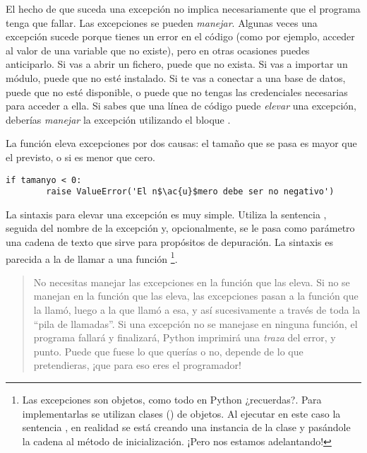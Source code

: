 El hecho de que suceda una excepción no implica necesariamente que el programa tenga que fallar. Las excepciones se pueden \emph{manejar}. Algunas veces una excepción sucede porque tienes un error en el código (como por ejemplo, acceder al valor de una variable que no existe), pero en otras ocasiones puedes anticiparlo. Si vas a abrir un fichero, puede que no exista. Si vas a importar un módulo, puede que no esté instalado. Si te vas a conectar a una base de datos, puede que no esté disponible, o puede que no tengas las credenciales necesarias para acceder a ella. Si sabes que una línea de código puede \emph{elevar} una excepción, deberías \emph{manejar} la excepción utilizando el bloque .

La función  eleva excepciones por dos causas: el tamaño que se pasa es mayor que el previsto, o si es menor que cero.

\noindent\begin{minipage}{\textwidth}
\begin{lstlisting}[mathescape=True]
    if tamanyo < 0:
        raise ValueError('El n$\ac{u}$mero debe ser no negativo')
\end{lstlisting}
\end{minipage}

La sintaxis para elevar una excepción es muy simple. Utiliza la sentencia , seguida del nombre de la excepción y, opcionalmente, se le pasa como parámetro una cadena de texto que sirve para propósitos de depuración. La sintaxis es parecida a la de llamar a una función \footnote{Las excepciones son objetos, como todo en Python ¿recuerdas?. Para implementarlas se utilizan clases () de objetos. Al ejecutar en este caso la sentencia , en realidad se está creando una instancia de la clase  y pasándole la cadena  al método de inicialización. ¡Pero nos estamos adelantando!}.

\begin{quote}
No necesitas manejar las excepciones en la función que las eleva. Si no se manejan en la función que las eleva, las excepciones pasan a la función que la llamó, luego a la que llamó a esa, y así sucesivamente a través de toda la ``pila de llamadas''. Si una excepción no se manejase en ninguna función, el programa fallará y finalizará, Python imprimirá una \emph{traza} del error, y punto. Puede que fuese lo que querías o no, depende de lo que pretendieras, ¡que para eso eres el programador!
\end{quote}

